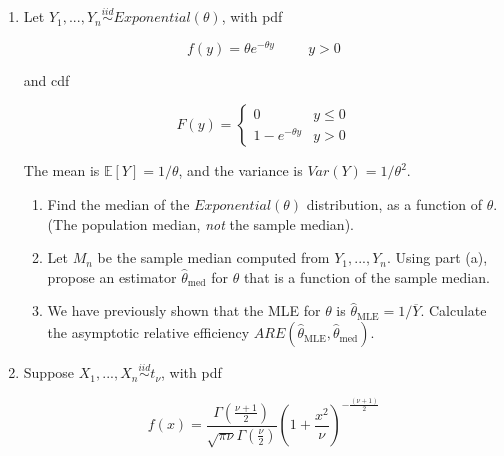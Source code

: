\documentclass[11pt]{article}
\begin{document}
\begin{enumerate}
\begin{enumerate}
\item How does the $ARE(\widehat{\beta}_{\text{MLE}}, \ \widehat{\beta}_{\text{MoM}})$ change as $\beta \to \infty$?

\item Explain the result from part (e) by discussing the behavior of the $Beta(1, \beta)$ distribution for large values of $\beta$, and the first-order Taylor expansion of the function $\log(1 - y)$ around 0.
\end{enumerate}




\bigskip

\item Let $Y_1,...,Y_n \overset{iid}{\sim} Exponential(\theta)$, with pdf 

$$f(y) = \theta e^{-\theta y} \hspace{1cm} y > 0$$

and cdf

$$F(y) = \begin{cases} 0 & y \leq 0 \\ 1 - e^{-\theta y} & y > 0 \end{cases}$$

The mean is $\mathbb{E}[Y] = 1/\theta$, and the variance is $Var(Y) = 1/\theta^2$.

\begin{enumerate}
\item Find the median of the $Exponential(\theta)$ distribution, as a function of $\theta$. (The population median, \textit{not} the sample median).

\item Let $M_n$ be the sample median computed from $Y_1,...,Y_n$. Using part (a), propose an estimator $\widehat{\theta}_{\text{med}}$ for $\theta$ that is a function of the sample median.

\item We have previously shown that the MLE for $\theta$ is $\widehat{\theta}_{\text{MLE}} = 1/\overline{Y}$. Calculate the asymptotic relative efficiency $ARE(\widehat{\theta}_{\text{MLE}}, \widehat{\theta}_{\text{med}})$.
\end{enumerate}

\item Suppose $X_1,...,X_n \overset{iid}{\sim} t_{\nu}$, with pdf

$$f(x) = \dfrac{\Gamma\left( \frac{\nu + 1}{2} \right)}{\sqrt{\pi \nu} \Gamma\left( \frac{\nu}{2} \right)} \left(1 + \frac{x^2}{\nu} \right)^{-\frac{(\nu + 1)}{2}}$$


\end{enumerate}
\end{document}
